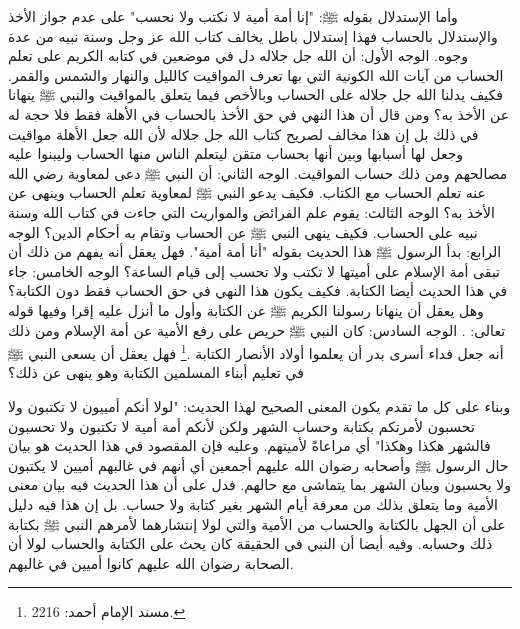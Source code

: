 وأما الإستدلال بقوله ﷺ: "إنا أمة أمية لا نكتب ولا نحسب" على عدم جواز الأخذ والإستدلال بالحساب فهذا إستدلال باطل يخالف كتاب الله عز وجل وسنة نبيه من عدة وجوه. الوجه الأول: أن الله جل جلاله دل في موضعين في كتابه الكريم على تعلم الحساب من آيات الله الكونية التي بها تعرف المواقيت كالليل والنهار والشمس والقمر. فكيف يدلنا الله جل جلاله على الحساب وبالأخص فيما يتعلق بالمواقيت والنبي ﷺ ينهانا عن الأخذ به؟ ومن قال أن هذا النهي في حق الأخذ بالحساب في الأهلة فقط فلا حجة له في ذلك بل إن هذا مخالف لصريح كتاب الله جل جلاله لأن الله جعل الأهلة مواقيت وجعل لها أسبابها وبين أنها بحساب متقن ليتعلم الناس منها الحساب وليبنوا عليه مصالحهم ومن ذلك حساب المواقيت. الوجه الثاني: أن النبي ﷺ دعى لمعاوية رضي الله عنه تعلم الحساب مع الكتاب. فكيف يدعو النبي ﷺ لمعاوية تعلم الحساب وينهى عن الأخذ به؟ الوجه الثالث: يقوم علم الفرائض والمواريث التي جاءت في كتاب الله وسنة نبيه على الحساب. فكيف ينهى النبي ﷺ عن الحساب وتقام به أحكام الدين؟ الوجه الرابع: بدأ الرسول ﷺ هذا الحديث بقوله "أنا أمة أمية". فهل يعقل أنه يفهم من ذلك أن تبقى أمة الإسلام على أميتها لا تكتب ولا تحسب إلى قيام الساعة؟ الوجه الخامس: جاء في هذا الحديث أيضا الكتابة. فكيف يكون هذا النهي في حق الحساب فقط دون الكتابة؟ وهل يعقل أن ينهانا رسولنا الكريم ﷺ عن الكتابة وأول ما أنزل عليه إقرا وفيها قوله تعالى: \quranayah*[96][4-5] {\footnotesize (\surahname*[96])}. الوجه السادس: كان النبي ﷺ حريص على رفع الأمية عن أمة الإسلام ومن ذلك أنه جعل فداء أسرى بدر أن يعلموا أولاد الأنصار الكتابة \href{https://shamela.ws/book/25794/1602#p1}{\faExternalLink} \cite{ahmid}.\footnote{مسند الإمام أحمد: 2216.} فهل يعقل أن يسعى النبي ﷺ  في تعليم أبناء المسلمين الكتابة وهو ينهى عن ذلك؟ 

وبناء على كل ما تقدم يكون المعنى الصحيح لهذا الحديث: "لولا أنكم أمييون لا تكتبون ولا تحسبون لأمرتكم بكتابة وحساب الشهر ولكن لأنكم أمة أمية لا تكتبون ولا تحسبون فالشهر هكذا وهكذا" أي مراعاةً لأميتهم. وعليه فإن المقصود في هذا الحديث هو بيان حال الرسول ﷺ وأصحابه رضوان الله عليهم أجمعين أي أنهم في غالبهم أميين لا يكتبون ولا يحسبون وبيان الشهر بما يتماشى مع حالهم. فدل على أن هذا الحديث فيه بيان معنى الأمية وما يتعلق بذلك من معرفة أيام الشهر بغير كتابة ولا حساب. بل إن هذا فيه دليل على أن الجهل بالكتابة والحساب من الأمية والتي لولا إنتشارهما لأمرهم النبي ﷺ بكتابة ذلك وحسابه. وفيه أيضا أن النبي في الحقيقة كان يحث على الكتابة والحساب لولا أن الصحابة رضوان الله عليهم كانوا أميين في غالبهم. 

